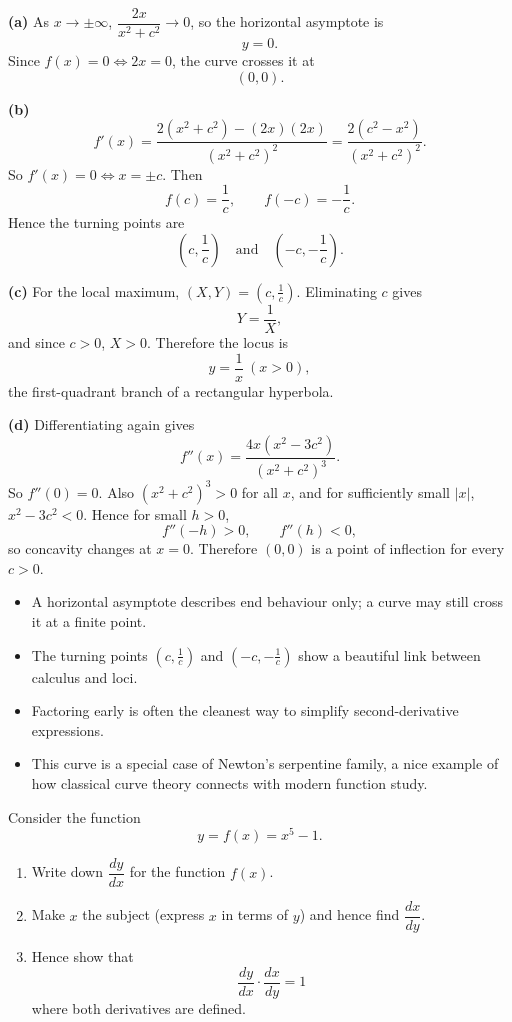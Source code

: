 \begin{solution}
\textbf{(a)} As $x\to\pm\infty$, $\dfrac{2x}{x^2+c^2}\to 0$, so the horizontal asymptote is
\[
\boxed{y=0}.
\]
Since $f(x)=0 \iff 2x=0$, the curve crosses it at
\[
\boxed{(0,0)}.
\]

\textbf{(b)}
\[
f'(x)=\frac{2(x^2+c^2)-(2x)(2x)}{(x^2+c^2)^2}
=\frac{2(c^2-x^2)}{(x^2+c^2)^2}.
\]
So $f'(x)=0 \iff x=\pm c$. Then
\[
f(c)=\frac1c,\qquad f(-c)=-\frac1c.
\]
Hence the turning points are
\[
\boxed{\left(c,\frac1c\right)}\quad \text{and} \quad \boxed{\left(-c,-\frac1c\right)}.
\]

\textbf{(c)} For the local maximum, $(X,Y)=\left(c,\frac1c\right)$. Eliminating $c$ gives
\[
Y=\frac1X,
\]
and since $c>0$, $X>0$. Therefore the locus is
\[
\boxed{y=\frac1x\ (x>0)},
\]
the first-quadrant branch of a rectangular hyperbola.

\textbf{(d)} Differentiating again gives
\[
f''(x)=\frac{4x(x^2-3c^2)}{(x^2+c^2)^3}.
\]
So $f''(0)=0$. Also $(x^2+c^2)^3>0$ for all $x$, and for sufficiently small $|x|$, $x^2-3c^2<0$. Hence for small $h>0$,
\[
f''(-h)>0,\qquad f''(h)<0,
\]
so concavity changes at $x=0$. Therefore $(0,0)$ is a point of inflection for every $c>0$.
\end{solution}

\begin{takeaways}
\begin{itemize}[leftmargin=*]
\item A horizontal asymptote describes end behaviour only; a curve may still cross it at a finite point.
\item The turning points $\left(c,\frac1c\right)$ and $\left(-c,-\frac1c\right)$ show a beautiful link between calculus and loci.
\item Factoring early is often the cleanest way to simplify second-derivative expressions.
\item This curve is a special case of Newton's serpentine family, a nice example of how classical curve theory connects with modern function study.
\end{itemize}
\end{takeaways}

\begin{problem}
Consider the function
\[
y=f(x)=x^5-1.
\]
\begin{enumerate}[label=(\roman*)]
\item Write down $\dfrac{dy}{dx}$ for the function $f(x)$.
\item Make $x$ the subject (express $x$ in terms of $y$) and hence find $\dfrac{dx}{dy}$.
\item Hence show that
\[
\frac{dy}{dx}\cdot \frac{dx}{dy}=1
\]
where both derivatives are defined.
\end{enumerate}
\end{problem}

